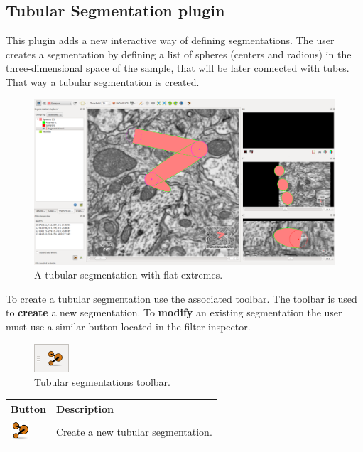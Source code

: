 \subsection{Tubular Segmentation plugin}

This plugin adds a new interactive way of defining segmentations. The user creates a
segmentation by defining a list of spheres (centers and radious) in the three-dimensional
space of the sample, that will be later connected with tubes.
That way a tubular segmentation is created.\\

\begin{figure}[H]
\centering
\includegraphics[scale=0.2]{fig/plugin-ts-segmentation.png}
\caption{A tubular segmentation with flat extremes.}
\end{figure}

To create a tubular segmentation use the associated toolbar. The toolbar is used to \textbf{create} a
new segmentation. To \textbf{modify} an existing segmentation the user must use a similar button located
in the filter inspector.
 
\begin{figure}[H]
\centering
\includegraphics[scale=0.75]{fig/plugin-ts-toolbar.png}
\caption{Tubular segmentations toolbar.}
\end{figure}

\begin{tabular}{| m{1.3cm} | m{12cm} |}
\hline
\textbf{Button} & \textbf{Description}\\
\hline
\includegraphics[width=0.7cm]{fig/tubular} & Create a new tubular segmentation.\\
\hline
\end{tabular}
\vspace{0.3cm} 

